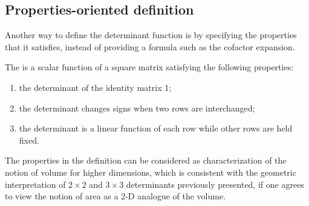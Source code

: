 \documentclass{ximera}
\begin{document}








\subsection{Properties-oriented definition}

Another way to define the determinant function is by specifying the
properties that it satisfies, instead of providing a formula such as
the cofactor expansion.

\begin{definition}
  The  is a scalar function of a square matrix
  satisfying the following properties:
  \begin{enumerate}
  \item the determinant of the identity matrix 1;
  \item the determinant changes signs when two rows are interchanged;
  \item the determinant is a linear function of each row while other
    rows are held fixed.
  \end{enumerate}
\end{definition}

The properties in the definition can be considered as characterization
of the notion of volume for higher dimensions, which is consistent
with the geometric interpretation of $2 \times 2$ and $3 \times 3$ determinants
previously presented, if one agrees to view the notion of area as a
2-D analogue of the volume.
\end{document}
